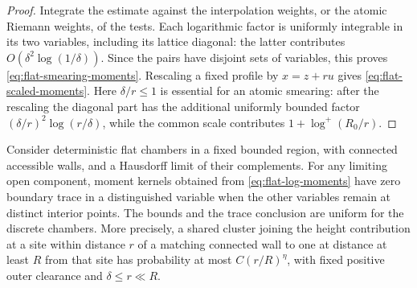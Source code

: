 \begin{proof}
Integrate the estimate against the interpolation weights, or the atomic
Riemann weights, of the tests. Each logarithmic factor is uniformly
integrable in its two variables, including its lattice diagonal: the latter
contributes $O(\delta^2\log(1/\delta))$. Since the pairs have disjoint sets
of variables, this proves \cref{eq:flat-smearing-moments}. Rescaling a
fixed profile by $x=z+ru$ gives \cref{eq:flat-scaled-moments}. Here
$\delta/r\le1$ is essential for an atomic smearing: after the rescaling
the diagonal part has the additional uniformly bounded factor
$(\delta/r)^2\log(r/\delta)$, while the common scale contributes
$1+\log^+(R_0/r)$.
\end{proof}

\begin{proposition}
\label{prop:boundary-decay}
Consider deterministic flat chambers in a fixed bounded region, with
connected accessible walls, and a Hausdorff limit of their complements.
For any limiting open component, moment kernels obtained from
\cref{eq:flat-log-moments} have zero boundary trace in a distinguished
variable when the other variables remain at distinct interior points.
The bounds and the trace conclusion are uniform for the discrete chambers.
More precisely, a shared cluster joining the height contribution at a site
within distance $r$ of a matching connected wall to one at distance at least
$R$ from that site has probability at most $C(r/R)^\eta$, with fixed
positive outer clearance and $\delta\le r\ll R$.
\end{proposition}

